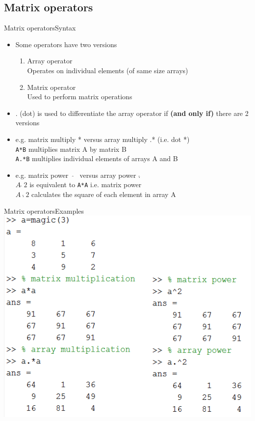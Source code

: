 \documentclass{beamer}
\begin{document}
\subsection{Matrix operators}
\begin{frame}{Matrix operators}{Syntax}
	\label{sec:matrix_operators}
	\begin{itemize}
		\item Some operators have two versions
		\begin{enumerate}
			\item Array operator\\
			Operates on individual elements (of same size arrays)
			\item Matrix operator\\
			Used to perform matrix operations
		\end{enumerate}
		\item . (dot) is used to differentiate the array operator if \textbf{(and only if)} there are 2 versions\\
		\item e.g. matrix multiply * versus array multiply .* (i.e. dot *)\\
		\texttt{A*B} multiplies matrix A by matrix B\\
		\texttt{A.*B} multiplies individual elements of arrays A and B\\
		\item e.g. matrix power \ $\hat{}$ \ versus array power .$\hat{}$\\
		\texttt{$A \ \hat{} \ 2$} is equivalent to \texttt{A*A} i.e. matrix power\\
		\texttt{$A \ . \hat{} \ 2$} calculates the square of each element in array A\\
	\end{itemize}
\end{frame}

\begin{frame}{Matrix operators}{Examples}
	\includegraphics[width=\textheight]{matrix_array_operator_examples}
\end{frame}
	
\end{document}
